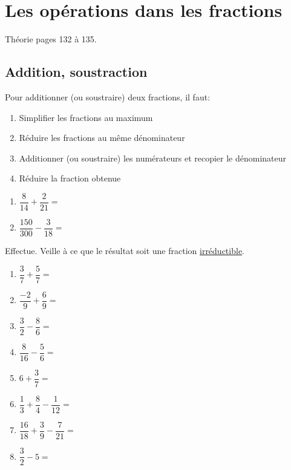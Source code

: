 \documentclass[../math2.tex]{subfiles}
\begin{document}
\setcounter{exercise}{0}
\chapter{Les opérations dans les fractions}

 Théorie pages 132 à 135.
\section{Addition, soustraction}

Pour additionner (ou soustraire) deux fractions, il faut:
\begin{enumerate}[label=\arabic*]
  \item Simplifier les fractions au maximum
  \item Réduire les fractions au même dénominateur
  \item Additionner (ou soustraire) les numérateurs et recopier le dénominateur
  \item Réduire la fraction obtenue
\end{enumerate}

\exemple 
\begin{enumerate}[cols=2]
  \item $\dfrac{8}{14} + \dfrac{2}{21}=$
  \item $\dfrac{150}{300} - \dfrac{3}{18}=$
\end{enumerate}
\vspace*{3cm} 

\newpage

\begin{exercise}
  Effectue. Veille à ce que le résultat soit une fraction \underline{irréductible}.

  \begin{enumerate}[cols=2, itemsep=3cm]
    \item $\dfrac{3}{7} + \dfrac{5}{7}=$
    \item $\dfrac{-2}{9} + \dfrac{6}{9}=$
    \item $\dfrac{3}{2} - \dfrac{8}{6}=$
    \item $\dfrac{8}{16} - \dfrac{5}{6}=$
    \item $6 + \dfrac{3}{7}=$
    \item $\dfrac{1}{3} + \dfrac{8}{4} - \dfrac{1}{12}=$
    \item $\dfrac{16}{18} + \dfrac{3}{9} - \dfrac{7}{21}=$
    \item $\dfrac{3}{2} - 5=$
  \end{enumerate}
  \vspace*{3cm}
\end{exercise}
\end{document}
